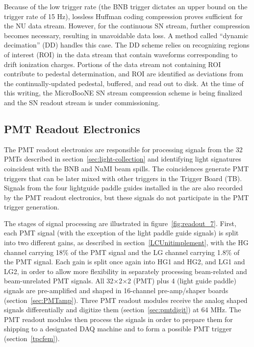 Because of the low trigger rate (the BNB trigger dictates an upper bound on the trigger rate of 15 Hz), lossless Huffman coding compression proves sufficient for the NU data stream. However, for the continuous SN stream, further compression becomes necessary, resulting in unavoidable data loss. A method called ``dynamic decimation'' (DD) handles this case. The DD scheme relies on recognizing regions of interest (ROI) in the data stream that contain waveforms corresponding to drift ionization charges. Portions of the data stream not containing ROI contribute to pedestal determination, and ROI are identified as deviations from the continually-updated pedestal, buffered, and read out to disk. At the time of this writing, the MicroBooNE SN stream compression scheme is being finalized and the SN readout stream is under commissioning.

\subsection{PMT Readout Electronics}

The PMT readout electronics are responsible for processing signals from the 32 PMTs described in section~\ref{sec:light-collection} and identifying light signatures coincident with the BNB and NuMI beam spills. The coincidences generate PMT triggers that can be later mixed with other triggers in the Trigger Board (TB). Signals from the four lightguide paddle guides installed in the \lartpc are also recorded by the PMT readout electronics, but these signals do not participate in the PMT trigger generation. 

The stages of signal processing are illustrated in figure~\ref{fig:readout_7}. First, each PMT signal (with the exception of the light paddle guide signals) is split into two different gains, as described in section~\ref{LCUnitimplement}, with the HG channel carrying 18$\%$ of the PMT signal and the LG channel carrying 1.8$\%$ of the PMT signal. Each gain is split once again into HG1 and HG2, and LG1 and LG2, in order to allow more flexibility in separately processing beam-related and beam-unrelated PMT signals. All 32$\times$2$\times$2 (PMT) plus 4 (light guide paddle) signals are pre-amplified and shaped in 16-channel pre-amp/shaper boards (section~\ref{sec:PMTamp}). Three PMT readout modules receive the analog shaped signals differentially and digitize them (section~\ref{sec:pmtdigit}) at 64 MHz. The PMT readout modules then process the signals in order to prepare them for shipping to a designated DAQ machine and to form a possible PMT trigger (section~\ref{tpcfem}). 

